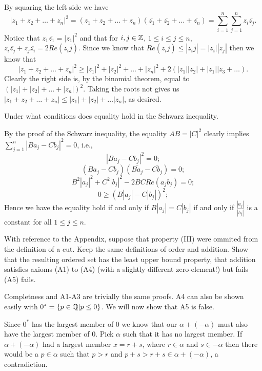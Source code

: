 \begin{solution}
  By squaring the left side we have \[|z_1 + z_2 + \ldots + z_n|^2 = (z_1 + z_2 + \ldots + z_n)(\overline{z_1} + \overline{z_2} + \ldots + \overline{z_n}) = \sum_{i = 1}^{n} \sum_{j = 1}^{n} z_i\overline{z_j}.\]
  Notice that $z_1\overline{z_1} = |z_1|^2$ and that for $i, j \in \mathbb{Z}$, $1 \le i \le j \le n$, $z_i\overline{z_j} + z_j\overline{z_i} = 2Re(z_i\overline{j})$.
  Since we know that $Re(z_i\overline{j}) \le |z_i\overline{j}| = |z_i||z_j|$ then we know that \[|z_1 + z_2 + \ldots + z_n|^2 \ge |z_1|^2 + |z_2|^2 + \ldots + |z_n|^2 + 2(|z_1||z_2| + |z_1||z_3 + \ldots).\]
  Clearly the right side is, by the binomial theorem, equal to $(|z_1| + |z_2| + \ldots + |z_n|)^2$.
  Taking the roots not gives us $|z_1 + z_2 + \ldots + z_n| \le |z_1| + |z_2| + \ldots |z_n|$, as desired.
\end{solution}

\setcounter{problem}{14}
\begin{problem}
  Under what conditions does equality hold in the Schwarz inequality.
\end{problem}

\begin{solution}
  By the proof of the Schwarz inequality, the equality $AB = |C|^2$ clearly implies $\sum_{j = 1}^{n} |Ba_j - Cb_j|^2 = 0$, i.e.,
  \[|Ba_j - Cb_j|^2 = 0;\]
  \[(Ba_j - Cb_j)(\overline{Ba_j} - \overline{Cb_j}) = 0;\]
  \[B^2|a_j|^2 + C^2|b_j|^2 - 2BCRe(a_jb_j) = 0;\]
  \[0 \ge (B|a_j| - C|b_j|)^2;\]
  Hence we have the equality hold if and only if $B|a_j| = C|b_j|$ if and only if $\frac{|a_j|}{|b_j|}$ is a constant for all $1 \le j \le n$.
\end{solution}

\setcounter{problem}{19}
\begin{problem}
  With reference to the Appendix, suppose that property (III) were ommited from the definition of a cut.
  Keep the same definitions of order and addition.
  Show that the resulting ordered set has the least upper bound property, that addition satisfies axioms (A1) to (A4) (with a slightly different zero-element!) but fails (A5) fails.
\end{problem}

\begin{solution}
  Completness and A1-A3 are trivially the same proofs.
  A4 can also be shown easily with $0^* = \{p \in \mathbb{Q} | p \le 0\}$.
  We will now show that A5 is false.

  Since $0^*$ has the largest member of 0 we know that our $\alpha + (-\alpha)$ must also have the largest member of $0$.
  Pick $\alpha$ such that it has no largest member.
  If $\alpha + (-\alpha)$ had a largest member $x = r + s$, where $r \in \alpha$ and $s \in -\alpha$ then there would be a $p \in \alpha$ such that $p > r$ and $p + s > r + s \in \alpha + (-\alpha)$, a contradiction.
\end{solution}
